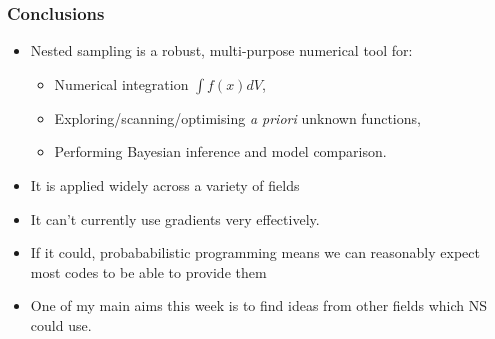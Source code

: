 \documentclass[aspectratio=169]{beamer}
\begin{document}
%
%
%    


\begin{frame}
    \frametitle{Conclusions}
    \begin{itemize}
        \item Nested sampling is a robust, multi-purpose numerical tool for:
            \begin{itemize}
                \item Numerical integration $\int f(x) dV$,
                \item Exploring/scanning/optimising \textit{a priori} unknown functions,
                \item Performing Bayesian inference and model comparison.
            \end{itemize}
        \item It is applied widely across a variety of fields
        \item It can't currently use gradients very effectively.
        \item If it could, probababilistic programming means we can reasonably expect most codes to be able to provide them
        \item One of my main aims this week is to find ideas from other fields which NS could use.
    \end{itemize}
\end{frame}
\end{document}
